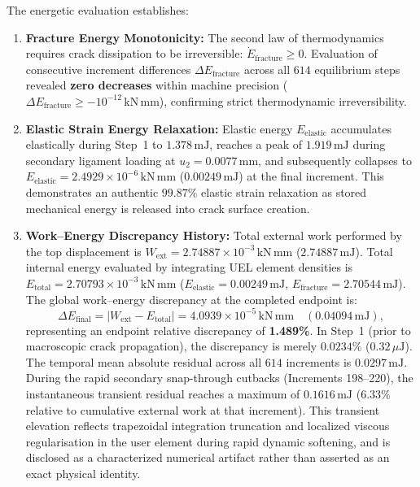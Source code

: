 The energetic evaluation establishes:
\begin{enumerate}
  \item \textbf{Fracture Energy Monotonicity:} The second law of thermodynamics requires crack dissipation to be irreversible: $\dot{E}_{\mathrm{fracture}} \ge 0$. Evaluation of consecutive increment differences $\Delta E_{\mathrm{fracture}}$ across all $614$ equilibrium steps revealed \textbf{zero decreases} within machine precision ($\Delta E_{\mathrm{fracture}} \ge -10^{-12}\,\mathrm{kN\,mm}$), confirming strict thermodynamic irreversibility.
  \item \textbf{Elastic Strain Energy Relaxation:} Elastic energy $E_{\mathrm{elastic}}$ accumulates elastically during Step~1 to $1.378\,\mathrm{mJ}$, reaches a peak of $1.919\,\mathrm{mJ}$ during secondary ligament loading at $u_2 = 0.0077\,\mathrm{mm}$, and subsequently collapses to $E_{\mathrm{elastic}} = 2.4929 \times 10^{-6}\,\mathrm{kN\,mm}$ ($0.00249\,\mathrm{mJ}$) at the final increment. This demonstrates an authentic $99.87\%$ elastic strain relaxation as stored mechanical energy is released into crack surface creation.
  \item \textbf{Work--Energy Discrepancy History:} Total external work performed by the top displacement is $W_{\mathrm{ext}} = 2.74887 \times 10^{-3}\,\mathrm{kN\,mm}$ ($2.74887\,\mathrm{mJ}$). Total internal energy evaluated by integrating UEL element densities is $E_{\mathrm{total}} = 2.70793 \times 10^{-3}\,\mathrm{kN\,mm}$ ($E_{\mathrm{elastic}} = 0.00249\,\mathrm{mJ}$, $E_{\mathrm{fracture}} = 2.70544\,\mathrm{mJ}$). The global work--energy discrepancy at the completed endpoint is:
  \begin{equation}
    \Delta E_{\mathrm{final}} = |W_{\mathrm{ext}} - E_{\mathrm{total}}| = 4.0939 \times 10^{-5}\,\mathrm{kN\,mm} \quad (0.04094\,\mathrm{mJ}),
  \end{equation}
  representing an endpoint relative discrepancy of \textbf{1.489\%}. In Step~1 (prior to macroscopic crack propagation), the discrepancy is merely $0.0234\%$ ($0.32\,\mu\mathrm{J}$). The temporal mean absolute residual across all $614$ increments is $0.0297\,\mathrm{mJ}$. During the rapid secondary snap-through cutbacks (Increments 198--220), the instantaneous transient residual reaches a maximum of $0.1616\,\mathrm{mJ}$ ($6.33\%$ relative to cumulative external work at that increment). This transient elevation reflects trapezoidal integration truncation and localized viscous regularisation in the user element during rapid dynamic softening, and is disclosed as a characterized numerical artifact rather than asserted as an exact physical identity.
\end{enumerate}

